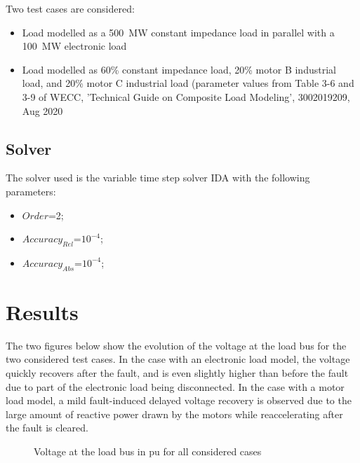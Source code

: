 \documentclass[a4paper, 12pt]{report}
\begin{document}
Two test cases are considered:
\begin{itemize}
\item Load modelled as a 500~MW constant impedance load in parallel with a 100~MW electronic load
\item Load modelled as 60\% constant impedance load, 20\% motor B industrial load, and 20\% motor C industrial load (parameter values from Table 3-6 and 3-9 of WECC, 'Technical Guide on Composite Load Modeling', 3002019209, Aug 2020
\end{itemize}

\subsection{Solver}
The solver used is the variable time step solver IDA with the following parameters:
\begin{itemize}
\item $Order$=2;
\item $Accuracy_{Rel}$=$10^{-4}$;
\item $Accuracy_{Abs}$=$10^{-4}$;
\end{itemize}

\newpage
\section{Results}

The two figures below show the evolution of the voltage at the load bus for the two considered test cases. In the case with an electronic load model, the voltage quickly recovers after the fault, and is even slightly higher than before the fault due to part of the electronic load being disconnected. In the case with a motor load model, a mild fault-induced delayed voltage recovery is observed due to the large amount of reactive power drawn by the motors while reaccelerating after the fault is cleared.

\begin{figure}[H]
\caption{Voltage at the load bus in pu for all considered cases}
\end{figure}
\end{document}
